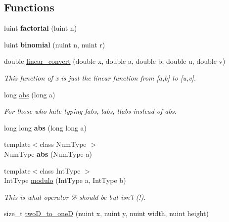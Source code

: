 \subsection*{Functions}
\begin{DoxyCompactItemize}
\item 
\hypertarget{namespacedscr_a8283bfa6a33a32d0a2e106d76ec74f98}{luint {\bfseries factorial} (luint n)}\label{namespacedscr_a8283bfa6a33a32d0a2e106d76ec74f98}

\item 
\hypertarget{namespacedscr_a201077a08596f9d5e388356658fd1e98}{luint {\bfseries binomial} (nuint n, nuint r)}\label{namespacedscr_a201077a08596f9d5e388356658fd1e98}

\item 
double \hyperlink{namespacedscr_a3e836c2a8d4d5653c8e16d64ad691804}{linear\-\_\-convert} (double x, double a, double b, double u, double v)
\begin{DoxyCompactList}\small\item\em This function of x is just the linear function from \mbox{[}a,b\mbox{]} to \mbox{[}u,v\mbox{]}. \end{DoxyCompactList}\item 
\hypertarget{namespacedscr_a2f6a607d7b428af7bb611b1727e01c9b}{long \hyperlink{namespacedscr_a2f6a607d7b428af7bb611b1727e01c9b}{abs} (long a)}\label{namespacedscr_a2f6a607d7b428af7bb611b1727e01c9b}

\begin{DoxyCompactList}\small\item\em For those who hate typing fabs, labs, llabs instead of abs. \end{DoxyCompactList}\item 
\hypertarget{namespacedscr_afd5dbf8ff7ccb33720d101010d0e5f6f}{long long {\bfseries abs} (long long a)}\label{namespacedscr_afd5dbf8ff7ccb33720d101010d0e5f6f}

\item 
\hypertarget{namespacedscr_a9e2112f4aad4f292d54e3533534c4acf}{{\footnotesize template$<$class Num\-Type $>$ }\\Num\-Type {\bfseries abs} (Num\-Type a)}\label{namespacedscr_a9e2112f4aad4f292d54e3533534c4acf}

\item 
{\footnotesize template$<$class Int\-Type $>$ }\\Int\-Type \hyperlink{namespacedscr_a3f6c67bf7abd8a7bd6a2cf78bd67eb7d}{modulo} (Int\-Type a, Int\-Type b)
\begin{DoxyCompactList}\small\item\em This is what operator \% should be but isn't (!). \end{DoxyCompactList}\item 
\hypertarget{namespacedscr_a529c386304de9d2a227fa85f614b51b6}{size\-\_\-t \hyperlink{namespacedscr_a529c386304de9d2a227fa85f614b51b6}{two\-D\-\_\-to\-\_\-one\-D} (nuint x, nuint y, nuint width, nuint height)}\label{namespacedscr_a529c386304de9d2a227fa85f614b51b6}


\end{DoxyCompactItemize}
